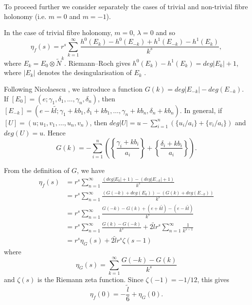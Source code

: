 \documentclass{amsart}
\theoremstyle{definition}
\theoremstyle{remark}
\numberwithin{equation}{section}
\begin{document}
To proceed further we consider separately the cases of trivial and non-trivial fibre holonomy (i.e. $m=0$ and $m = -1$).

In the case of trivial fibre holonomy, $m=0$, $\lambda = 0$ and so
\[
\eta_f(s) = r^s \sum_{k=1}^{\infty} \frac{h^0(E_k) - h^0(E_{-k}) + h^1(E_{-k}) - h^1(E_k) }{ k^s },
\]
where $E_k = E_0 \otimes \widetilde{N}^k$. Riemann--Roch gives $h^0(E_k) - h^1(E_k) = deg| E_k | + 1$, where $|E_k|$ denotes the desingularisation of $E_k$ \cite[]{moy}.

Following Nicolaescu \cite{nic2}, we introduce a function $G(k) = deg|E_{-k}| - deg(E_{-k})$. If $[E_0] = (e ; \gamma_1 , \delta_1 , \dots , \gamma_n , \delta_n)$, then $[E_{-k}] = (e - k\widetilde{l} ; \gamma_1 + kb_1 , \delta_1 + kb_1 , \dots , \gamma_n + kb_n , \delta_n + kb_n)$. In general, if $[U] = ( u ; u_1 , v_1 , \dots , u_n , v_n)$, then $deg|U| = u - \sum_{i=1}^{n} ( \{u_i/a_i\} + \{v_i/a_i\})$ and $deg(U) = u$. Hence
\[
G(k) = -\sum_{i=1}^{n} \left( \left\{ \frac{ \gamma_i + kb_i}{a_i} \right\} + \left\{ \frac{\delta_i + kb_i}{a_i} \right\} \right).
\]

From the definition of $G$, we have
\begin{align*}
\eta_f(s) &= r^s \sum_{n=1}^{\infty} \frac{ (deg|E_k| + 1) - (deg|E_{-k}| + 1) }{ k^s} \\
&= r^s \sum_{n=1}^{\infty} \frac{ (G(-k) + deg(E_k) ) - (G(k) + deg(E_{-k}) ) }{k^s} \\
&= r^s \sum_{n=1}^{\infty} \frac{ G(-k) - G(k) + (e + k\widetilde{l}) - (e - k\widetilde{l}) }{k^s} \\
&= r^s \sum_{n=1}^{\infty} \frac{G(k)-G(-k)}{k^s} + 2 \widetilde{l} r^s \sum_{n=1}^{\infty} \frac{1}{k^{s-1}} \\
&= r^s \eta_G(s) + 2 \widetilde{l} r^s \zeta(s-1)
\end{align*}
where
\[
\eta_G(s) = \sum_{k=1}^{\infty} \frac{ G(-k) - G(k) }{k^s}
\]
and $\zeta(s)$ is the Riemann zeta function. Since $\zeta(-1) = -1/12$, this gives
\begin{equation}\label{equ:etafG}
\eta_f(0) = -\frac{\widetilde{l}}{6} + \eta_G(0).
\end{equation}
\end{document}

